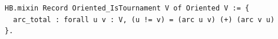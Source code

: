 \begin{lstlisting}[language=Rocq]
HB.mixin Record Oriented_IsTournament V of Oriented V := {
  arc_total : forall u v : V, (u != v) = (arc u v) (+) (arc v u)
}.
\end{lstlisting}
